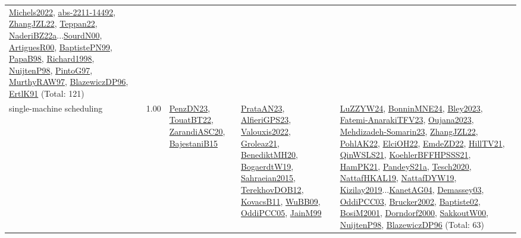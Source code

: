 {\begin{longtable}{p{3cm}r>{\raggedright\arraybackslash}p{6cm}>{\raggedright\arraybackslash}p{6cm}>{\raggedright\arraybackslash}p{8cm}}
\hyperref[detail:Michels2022]{Michels2022}, \hyperref[detail:abs-2211-14492]{abs-2211-14492}, \hyperref[detail:ZhangJZL22]{ZhangJZL22}, \hyperref[detail:Teppan22]{Teppan22}, \hyperref[detail:NaderiBZ22a]{NaderiBZ22a}...\hyperref[detail:SourdN00]{SourdN00}, \hyperref[detail:ArtiguesR00]{ArtiguesR00}, \hyperref[detail:BaptistePN99]{BaptistePN99}, \hyperref[detail:PapaB98]{PapaB98}, \hyperref[detail:Richard1998]{Richard1998}, \hyperref[detail:NuijtenP98]{NuijtenP98}, \hyperref[detail:PintoG97]{PintoG97}, \hyperref[detail:MurthyRAW97]{MurthyRAW97}, \hyperref[detail:BlazewiczDP96]{BlazewiczDP96}, \hyperref[detail:ErtlK91]{ErtlK91} (Total: 121)\\
\index{single-machine scheduling}\index{Concepts!single-machine scheduling}single-machine scheduling &  1.00 & \hyperref[detail:PenzDN23]{PenzDN23}, \hyperref[detail:TouatBT22]{TouatBT22}, \hyperref[detail:ZarandiASC20]{ZarandiASC20}, \hyperref[detail:BajestaniB15]{BajestaniB15} & \hyperref[detail:PrataAN23]{PrataAN23}, \hyperref[detail:AlfieriGPS23]{AlfieriGPS23}, \hyperref[detail:Valouxis2022]{Valouxis2022}, \hyperref[detail:Groleaz21]{Groleaz21}, \hyperref[detail:BenediktMH20]{BenediktMH20}, \hyperref[detail:BogaerdtW19]{BogaerdtW19}, \hyperref[detail:Sahraeian2015]{Sahraeian2015}, \hyperref[detail:TerekhovDOB12]{TerekhovDOB12}, \hyperref[detail:KovacsB11]{KovacsB11}, \hyperref[detail:WuBB09]{WuBB09}, \hyperref[detail:OddiPCC05]{OddiPCC05}, \hyperref[detail:JainM99]{JainM99} & \hyperref[detail:LuZZYW24]{LuZZYW24}, \hyperref[detail:BonninMNE24]{BonninMNE24}, \hyperref[detail:Bley2023]{Bley2023}, \hyperref[detail:Fatemi-AnarakiTFV23]{Fatemi-AnarakiTFV23}, \hyperref[detail:Oujana2023]{Oujana2023}, \hyperref[detail:Mehdizadeh-Somarin23]{Mehdizadeh-Somarin23}, \hyperref[detail:ZhangJZL22]{ZhangJZL22}, \hyperref[detail:PohlAK22]{PohlAK22}, \hyperref[detail:ElciOH22]{ElciOH22}, \hyperref[detail:EmdeZD22]{EmdeZD22}, \hyperref[detail:HillTV21]{HillTV21}, \hyperref[detail:QinWSLS21]{QinWSLS21}, \hyperref[detail:KoehlerBFFHPSSS21]{KoehlerBFFHPSSS21}, \hyperref[detail:HamPK21]{HamPK21}, \hyperref[detail:PandeyS21a]{PandeyS21a}, \hyperref[detail:Tesch2020]{Tesch2020}, \hyperref[detail:NattafHKAL19]{NattafHKAL19}, \hyperref[detail:NattafDYW19]{NattafDYW19}, \hyperref[detail:Kizilay2019]{Kizilay2019}...\hyperref[detail:KanetAG04]{KanetAG04}, \hyperref[detail:Demassey03]{Demassey03}, \hyperref[detail:OddiPCC03]{OddiPCC03}, \hyperref[detail:Brucker2002]{Brucker2002}, \hyperref[detail:Baptiste02]{Baptiste02}, \hyperref[detail:BosiM2001]{BosiM2001}, \hyperref[detail:Dorndorf2000]{Dorndorf2000}, \hyperref[detail:SakkoutW00]{SakkoutW00}, \hyperref[detail:NuijtenP98]{NuijtenP98}, \hyperref[detail:BlazewiczDP96]{BlazewiczDP96} (Total: 63)\\

\end{longtable}}
